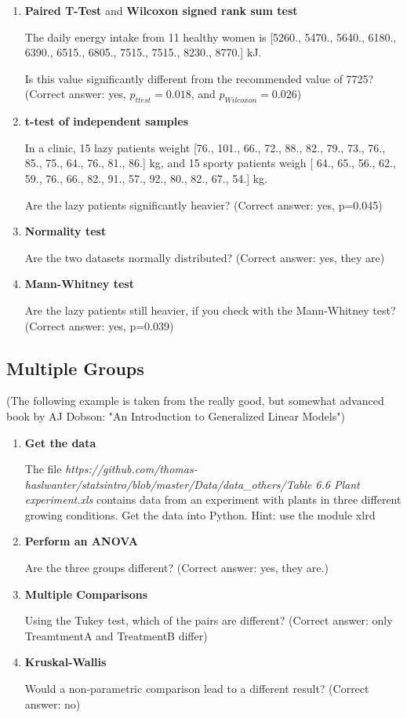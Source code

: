 \begin{enumerate}
  \item \textbf{Paired T-Test} and \textbf{Wilcoxon signed rank sum test}

The daily energy intake from 11 healthy women is [5260., 5470., 5640., 6180., 6390., 6515., 6805., 7515., 7515., 8230., 8770.] kJ.

    Is this value significantly different from the recommended value of 7725?
    (Correct answer: yes, $p_{ttest}=0.018$, and $p_{Wilcoxon}=0.026$)

  \item \textbf{t-test of independent samples}

In a clinic, 15 lazy patients weight [76., 101., 66., 72., 88., 82., 79., 73., 76., 85., 75., 64., 76., 81., 86.] kg, and 15 sporty patients weigh [ 64., 65., 56., 62., 59., 76., 66., 82., 91., 57., 92., 80., 82., 67., 54.] kg.

    Are the lazy patients significantly heavier?
    (Correct answer: yes, p=0.045)

  \item \textbf{Normality test}

    Are the two datasets normally distributed?
    (Correct answer: yes, they are)

  \item \textbf{Mann-Whitney test}

    Are the lazy patients still heavier, if you check with the Mann-Whitney test?
    (Correct answer: yes, p=0.039)
\end{enumerate}

\subsection{Multiple Groups}

(The following example is taken from the really good, but somewhat advanced book by AJ Dobson: "An Introduction to Generalized Linear Models")

\begin{enumerate}
  \item \textbf{Get the data}

    The file   \emph{https://github.com/thomas-haslwanter/statsintro/blob/master/Data/data\_others/Table 6.6 Plant experiment.xls} contains data from an experiment with plants in three different growing conditions. Get the data into Python.
    Hint: use the module xlrd

  \item \textbf{Perform an ANOVA}

    Are the three groups different?
    (Correct answer: yes, they are.)

  \item \textbf{Multiple Comparisons}

    Using the Tukey test, which of the pairs are different?
    (Correct answer: only TreamtmentA and TreatmentB differ)

  \item \textbf{Kruskal-Wallis}

    Would a non-parametric comparison lead to a different result?
    (Correct answer: no)

\end{enumerate}
